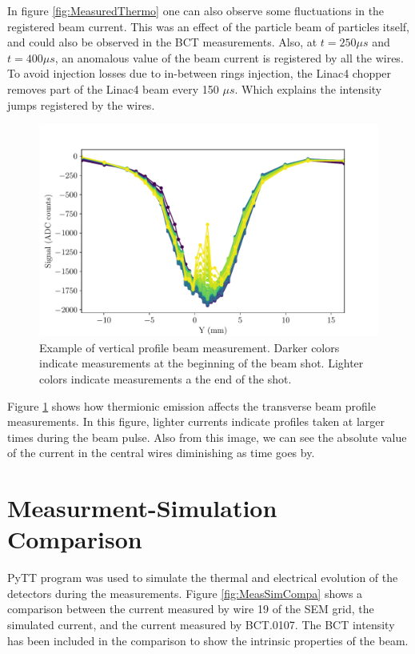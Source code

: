 In figure \ref{fig:MeasuredThermo} one can also observe some fluctuations in the registered beam current. This was an effect of the particle beam of particles itself, and could also be observed in the BCT measurements. Also, at $t = 250 \mu s$ and $t = 400 \mu s$, an anomalous value of the beam current is registered by all the wires. To avoid injection losses due to in-between rings injection, the Linac4 chopper removes part of the Linac4 beam every 150 $\mu s$. Which explains the intensity jumps registered by the wires. 

\begin{figure}[h]
    \centering
    \includegraphics[width=0.75\columnwidth]{Figure_ThermionicMeasurements/ProfileJth.pdf}
    \caption{Example of vertical profile beam measurement. Darker colors indicate measurements at the beginning of the beam shot. Lighter colors indicate measurements a the end of the shot. }
    \label{fig:JthInProf}
\end{figure}

Figure \ref{fig:JthInProf} shows how thermionic emission affects the transverse beam profile measurements. In this figure, lighter currents indicate profiles taken at larger times during the beam pulse. Also from this image, we can see the absolute value of the current in the central wires diminishing as time goes by. 

\section{Measurment-Simulation Comparison}

PyTT program was used to simulate the thermal and electrical evolution of the detectors during the measurements. Figure \ref{fig:MeasSimCompa} shows a comparison between the current measured by wire 19 of the SEM grid, the simulated current, and the current measured by BCT.0107. The BCT intensity has been included in the comparison to show the intrinsic properties of the beam.

